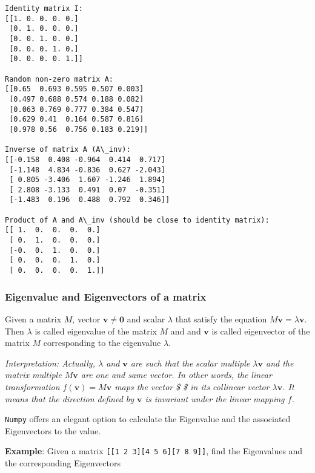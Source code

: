 \documentclass[11pt]{article}
\begin{document}
    \begin{Verbatim}[commandchars=\\\{\}]
Identity matrix I:
[[1. 0. 0. 0. 0.]
 [0. 1. 0. 0. 0.]
 [0. 0. 1. 0. 0.]
 [0. 0. 0. 1. 0.]
 [0. 0. 0. 0. 1.]]

Random non-zero matrix A:
[[0.65  0.693 0.595 0.507 0.003]
 [0.497 0.688 0.574 0.188 0.082]
 [0.063 0.769 0.777 0.384 0.547]
 [0.629 0.41  0.164 0.587 0.816]
 [0.978 0.56  0.756 0.183 0.219]]

Inverse of matrix A (A\_inv):
[[-0.158  0.408 -0.964  0.414  0.717]
 [-1.148  4.834 -0.836  0.627 -2.043]
 [ 0.805 -3.406  1.607 -1.246  1.894]
 [ 2.808 -3.133  0.491  0.07  -0.351]
 [-1.483  0.196  0.488  0.792  0.346]]

Product of A and A\_inv (should be close to identity matrix):
[[ 1.  0.  0.  0.  0.]
 [ 0.  1.  0.  0.  0.]
 [-0.  0.  1.  0.  0.]
 [ 0.  0.  0.  1.  0.]
 [ 0.  0.  0.  0.  1.]]

    \end{Verbatim}

    \newpage

\subsubsection{Eigenvalue and Eigenvectors of a
matrix}\label{eigenvalue-and-eigenvectors-of-a-matrix}

Given a matrix \(M\), vector \(\pmb{{v}} \ne \mathbf{0}\) and scalar
\(\lambda\) that satisfy the equation
\(M \pmb{{v}} = \lambda \pmb{{v}}\). Then \(\lambda\) is called
eigenvalue of the matrix \(M\) and and \(\pmb{{v}}\) is called
eigenvector of the matrix \(M\) corresponding to the eigenvalue
\(\lambda\).

\emph{Interpretation: Actually, \(\lambda\) and \(\pmb{{v}}\) are such
that the scalar multiple \(\lambda \pmb{{v}}\) and the matrix multiple
\(M\pmb{{v}}\) are one and same vector. In other words, the linear
transformation \(f(\pmb{{v}})=M\pmb{{v}}\) maps the vector \$
\$ in its collinear vector \(\lambda \pmb{{v}}\). It means that
the direction defined by \(\pmb{{v}}\) is invariant under the linear
mapping \(f\).}

\texttt{Numpy} offers an elegant option to calculate the Eigenvalue and
the associated Eigenvectors to the value.

\textbf{Example}: Given a matrix
\texttt{{[}{[}1\ 2\ 3{]}{[}4\ 5\ 6{]}{[}7\ 8\ 9{]}{]}}, find the
Eigenvalues and the corresponding Eigenvectors
\end{document}
